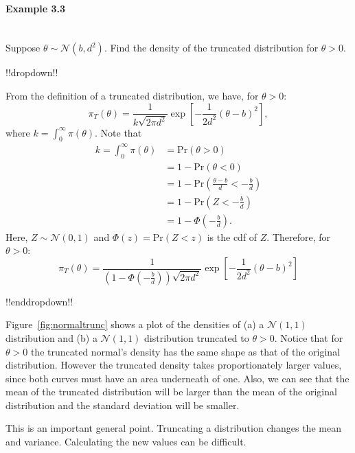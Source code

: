 \paragraph{Example 3.3}{~\\
Suppose $\theta \sim \mathcal{N}(b,d^2)$.
Find the density of the truncated distribution for $\theta>0$.



!!dropdown!!

From the definition of a truncated distribution, we have, for $\theta >0$:
    $$ \pi_T(\theta) = \frac{1}{k \sqrt{2\pi d^2}}\exp\left[-\frac{1}{2d^2}(\theta - b)^2\right], $$
    where $k = \int_0^\infty \pi(\theta).$ Note that 
    \begin{align*}
       k = \int_0^\infty \pi(\theta) &= \text{Pr}(\theta > 0) \\
       &= 1 - \text{Pr}(\theta < 0) \\
       &= 1 - \text{Pr}\left(\frac{\theta - b}{d} < -\frac{b}{d}\right) \\
       &= 1 - \text{Pr}\left(Z < -\frac{b}{d} \right) \\
       &= 1 - \Phi\left(-\frac{b}{d}\right).
    \end{align*}
    Here, $Z \sim \mathcal{N}(0,1)$ and $\Phi(z) = \text{Pr}(Z < z)$ is the cdf of $Z$. Therefore, for $\theta > 0$:
    $$\pi_T(\theta)  = \frac{1}{\left(1 - \Phi\left(-\frac{b}{d}\right)\right) \sqrt{2\pi d^2}}\exp\left[-\frac{1}{2d^2}(\theta - b)^2\right] $$

!!enddropdown!!}

Figure~\ref{fig:normaltrunc} shows a plot of the densities of (a) a $\mathcal{N}(1,1)$
distribution and (b) a $\mathcal{N}(1,1)$ distribution truncated to $\theta>0$.
Notice that for $\theta>0$ the truncated normal's density
has the same shape as that of the original distribution.
However the truncated density takes proportionately larger values,
since both curves must have an area underneath of one.
Also, we can see that the mean of the truncated distribution will be larger than the mean of the original distribution and the standard deviation will be smaller.

This is an important general point.
Truncating a distribution changes the mean and variance.
Calculating the new values can be difficult.

